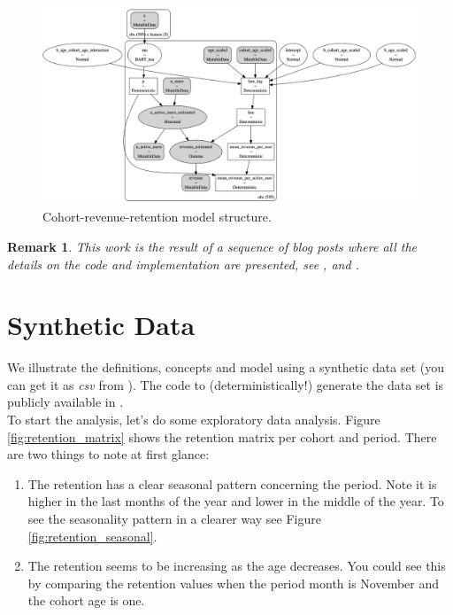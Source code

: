 \documentclass[11pt]{amsart}
\newtheorem{remark}{Remark}
\begin{document}
\begin{figure}
    \centering
    \includegraphics[width=\textwidth]{images/revenue_retention_33_0.png}
    \caption{Cohort-revenue-retention model structure.}
    \label{fig:revenue_retention_model}
\end{figure}


\begin{remark}
This work is the result of a sequence of blog posts where all the details on the code
and implementation are presented, see \cite{orduz_retention},
\cite{orduz_retention_bart} and \cite{orduz_revenue_retention}.  
\end{remark}


\section{Synthetic Data}

We illustrate the definitions, concepts and model using a synthetic data set (you can
get it as {\em csv} from \cite{orduz_revenue_retention_data}). The code to
(deterministically!) generate the data set is publicly available in 
\cite{orduz_revenue_retention_data_code}. \\

To start the analysis, let's do some exploratory data analysis. Figure
\ref{fig:retention_matrix} shows the retention matrix per cohort and period. There are 
two things to note at first glance:

\begin{enumerate}
    \item The retention has a clear seasonal pattern concerning the period. Note it is 
        higher in the last months of the year and lower in the middle of the year. To 
        see the seasonality pattern in a clearer way see Figure 
        \ref{fig:retention_seasonal}.
    \item The retention seems to be increasing as the age decreases. You could see this
    by comparing the retention values when the period month is November and the cohort
    age is one.
\end{enumerate}
\end{document}
